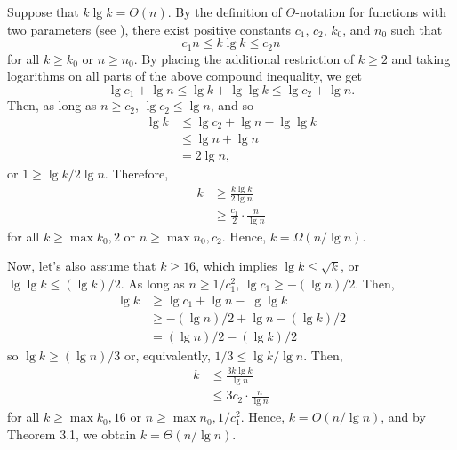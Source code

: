 Suppose that $k\lg k=\Theta(n)$.
By the definition of $\Theta$-notation for functions with two parameters (see ), there exist positive constants $c_1$, $c_2$, $k_0$, and $n_0$ such that
\[
    c_1n \le k\lg k \le c_2n
\]
for all $k\ge k_0$ or $n\ge n_0$.
By placing the additional restriction of $k\ge2$ and taking logarithms on all parts of the above compound inequality, we get
\[
    \lg c_1+\lg n \le \lg k+\lg\lg k \le \lg c_2+\lg n.
\]
Then, as long as $n\ge c_2$, $\lg c_2\le\lg n$, and so
\begin{align*}
    \lg k &\le \lg c_2+\lg n-\lg\lg k \\
    &\le \lg n+\lg n \\
    &= 2\lg n,
\end{align*}
or $1\ge\lg k/2\lg n$.
Therefore,
\begin{align*}
    k &\ge \frac{k\lg k}{2\lg n} \\[1mm]
    &\ge \frac{c_1}{2}\cdot\frac{n}{\lg n}
\end{align*}
for all $k\ge\max{k_0,2}$ or $n\ge\max{n_0,c_2}$.
Hence, $k=\Omega(n/\lg n)$.

Now, let's also assume that $k\ge16$, which implies $\lg k\le\sqrt{k}$, or $\lg\lg k\le(\lg k)/2$.
As long as $n\ge1/c_1^2$, $\lg c_1\ge-(\lg n)/2$.
Then,
\begin{align*}
    \lg k &\ge \lg c_1+\lg n-\lg\lg k \\
    &\ge -(\lg n)/2+\lg n-(\lg k)/2 \\
    &= (\lg n)/2-(\lg k)/2
\end{align*}
so $\lg k\ge(\lg n)/3$ or, equivalently, $1/3\le\lg k/\lg n$.
Then,
\begin{align*}
    k &\le \frac{3k\lg k}{\lg n} \\
    &\le 3c_2\cdot\frac{n}{\lg n}
\end{align*}
for all $k\ge\max{k_0,16}$ or $n\ge\max{n_0,1/c_1^2}$.
Hence, $k=O(n/\lg n)$, and by Theorem 3.1, we obtain $k=\Theta(n/\lg n)$.
